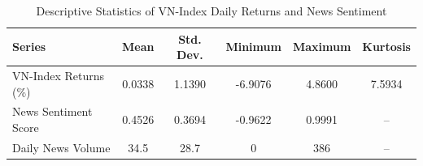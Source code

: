\begin{table}[htbp]
    \centering
    \caption{Descriptive Statistics of VN-Index Daily Returns and News Sentiment}
    \label{tab:descriptive_stats}
    \begin{tabular}{@{}lccccc@{}}
    \toprule
    Series & Mean & Std. Dev. & Minimum & Maximum & Kurtosis \\
    \midrule
    VN-Index Returns (\%) & 0.0338 & 1.1390 & -6.9076 & 4.8600 & 7.5934 \\
    News Sentiment Score & 0.4526 & 0.3694 & -0.9622 & 0.9991 & -- \\
    Daily News Volume & 34.5 & 28.7 & 0 & 386 & -- \\
    \bottomrule
    \end{tabular}
\end{table}
